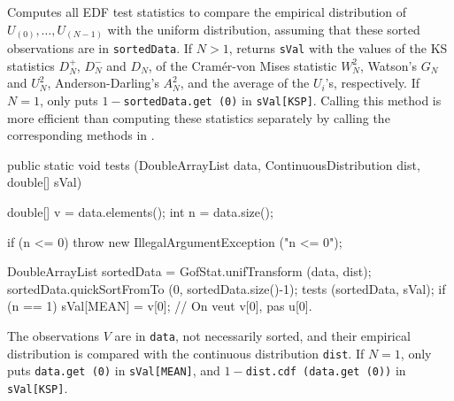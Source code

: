 \begin{tabb} Computes all EDF test statistics
  to compare the empirical
  distribution of  $U_{(0)},\dots,U_{(N-1)}$ with the uniform distribution,
  assuming that these sorted observations are in \texttt{sortedData}.
  If $N > 1$, returns \texttt{sVal} with the values of the KS
  statistics $D_N^+$, $D_N^-$ and $D_N$, of the Cram\'er-von Mises
  statistic $W_N^2$, Watson's $G_N$ and $U_N^2$, Anderson-Darling's
  $A_N^2$, and the average of the $U_i$'s, respectively.
  If $N = 1$, only puts $1 - {}$\texttt{sortedData.get (0)} in \texttt{sVal[KSP]}.
  Calling this method is more efficient than computing these statistics
  separately by calling the corresponding methods in .
\end{tabb}
\begin{htmlonly}
\end{htmlonly}
\begin{code}

   public static void tests (DoubleArrayList data,
                             ContinuousDistribution dist, double[] sVal)\begin{hide} {

      double[] v = data.elements();
      int n = data.size();

      if (n <= 0)
        throw new IllegalArgumentException ("n <= 0");

      DoubleArrayList sortedData = GofStat.unifTransform (data, dist);
      sortedData.quickSortFromTo (0, sortedData.size()-1);
      tests (sortedData, sVal);
      if (n == 1)
         sVal[MEAN] = v[0];     // On veut v[0], pas u[0].
   }\end{hide}
\end{code}
\begin{tabb} The observations $V$ are in \texttt{data},
  not necessarily sorted, and their empirical
  distribution is compared with the continuous distribution \texttt{dist}.
 If $N = 1$, only puts \texttt{data.get (0)} in \texttt{sVal[MEAN]},
 and $1 - {}$\texttt{dist.cdf (data.get (0))} in \texttt{sVal[KSP]}.
\end{tabb}
